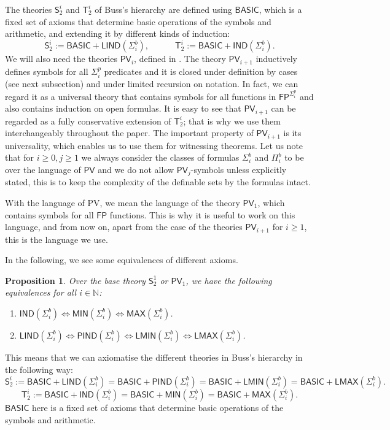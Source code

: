 \documentclass[11pt]{article}
\newcommand{\N}{\mathbb{N}}
\newcommand{\PV}{\mathsf{PV}}
\newcommand{\SOT}{\mathsf{S}^1_2}
\newcommand{\FP}{\mathsf{FP}}
\newtheorem{proposition}[theorem]{Proposition}
\theoremstyle{definition}
\theoremstyle{definition}
\theoremstyle{remark}
\begin{document}
The theories $\mathsf{S}^i_2$ and $\mathsf{T}^i_2$ of Buss's hierarchy are defined using $\mathsf{BASIC}$, which is a fixed set of axioms that determine basic operations of the symbols and arithmetic, and extending it by different kinds of induction:
$$
\mathsf{S}^i_2:= \mathsf{BASIC} + \mathsf{LIND}(\Sigma^b_i), \quad \quad \quad \mathsf{T}^i_2 := \mathsf{BASIC} + \mathsf{IND}(\Sigma^b_i).
$$
We will also need the theories $\PV_i$, defined in \cite{KrajicekPT91,Coo75}. The theory $\PV_{i+1}$ inductively defines symbols for all $\Sigma^p_i$ predicates and it is closed under definition by cases (see next subsection) and under limited recursion on notation. In fact, we can regard it as a universal theory that contains symbols for all functions in $\FP^{\Sigma^p_i}$ and also contains induction on open formulas. It is easy to see that $\PV_{i+1}$ can be regarded as a fully conservative extension of $\mathsf{T}^i_2$; that is why we use them interchangeably throughout the paper. The important property of $\PV_{i+1}$ is its universality, which enables us to use them for witnessing theorems. Let us note that for $i\geq 0,j\geq 1$ we always consider the classes of formulas $\Sigma^b_i$ and $\Pi^b_i$ to be over the language of $\PV$ and we do not allow $\PV_j$-symbols unless explicitly stated, this is to keep the complexity of the definable sets by the formulas intact.

With the language of PV, we mean the language of the theory $\PV_1$, which contains symbols for all $\FP$ functions. This is why it is useful to work on this language, and from now on, apart from the case of the theories $\PV_{i+1}$ for $i\geq 1$, this is the language we use.

In the following, we see some equivalences of different axioms.

\begin{proposition}\label{prop:axioms}
    Over the base theory $\SOT$ or $\PV_1$, we have the following equivalences for all $i\in \N$:
    \begin{enumerate}
        \item[(a)] $\mathsf{IND}(\Sigma^b_i) \iff \mathsf{MIN}(\Sigma^b_i) \iff \mathsf{MAX}(\Sigma^b_i)$.
        \item[(b)] $\mathsf{LIND}(\Sigma^b_i) \iff \mathsf{PIND}(\Sigma^b_i) \iff \mathsf{LMIN}(\Sigma^b_i) \iff \mathsf{LMAX}(\Sigma^b_i)$.
    \end{enumerate}
\end{proposition}

This means that we can axiomatise the different theories in Buss's hierarchy in the following way:
$$
\mathsf{S}^i_2 := \mathsf{BASIC} + \mathsf{LIND}(\Sigma^b_i) = \mathsf{BASIC} + \mathsf{PIND}(\Sigma^b_i) = \mathsf{BASIC} + \mathsf{LMIN}(\Sigma^b_i) = \mathsf{BASIC} + \mathsf{LMAX}(\Sigma^b_i).
$$
$$
\mathsf{T}^i_2 := \mathsf{BASIC} + \mathsf{IND}(\Sigma^b_i) = \mathsf{BASIC} + \mathsf{MIN}(\Sigma^b_i) = \mathsf{BASIC} + \mathsf{MAX}(\Sigma^b_i).
$$
$\mathsf{BASIC}$ here is a fixed set of axioms that determine basic operations of the symbols and arithmetic.
\end{document}
